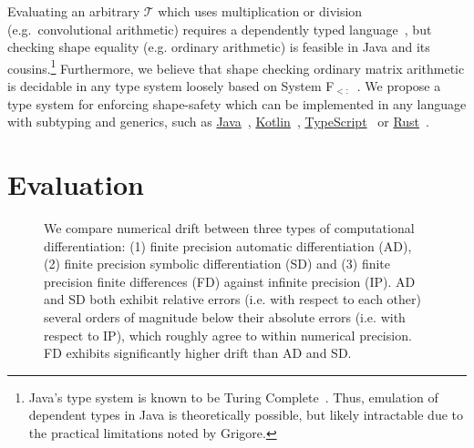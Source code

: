 \documentclass{article}
\begin{document}
Evaluating an arbitrary $\mathcal{T}$ which uses multiplication or division (e.g.\ convolutional arithmetic) requires a dependently typed language~\citep{xi1998eliminating, pineyro2019structure}, but checking shape equality (e.g. ordinary arithmetic) is feasible in Java and its cousins.\footnote{Java's type system is known to be Turing Complete~\citep{grigore2017java}. Thus, emulation of dependent types in Java is theoretically possible, but likely intractable due to the practical limitations noted by Grigore.} Furthermore, we believe that shape checking ordinary matrix arithmetic is decidable in any type system loosely based on System F${}_{<:}$~\citep{cardelli1991extension}. We propose a type system for enforcing shape-safety which can be implemented in any language with subtyping and generics, such as \href{https://docs.oracle.com/javase/tutorial/java/generics/index.html}{Java}~\citep{naftalin2007java}, \href{https://kotlinlang.org/docs/reference/generics.html}{Kotlin}~\citep{tate2013mixed}, \href{https://www.typescriptlang.org/docs/handbook/advanced-types.html}{TypeScript}~\citep{bierman2014understanding} or \href{https://doc.rust-lang.org/1.7.0/book/generics.html}{Rust}~\citep{crozet2019nalgebra}.

\section{Evaluation}
\begin{figure}
    \caption{We compare numerical drift between three types of computational differentiation: (1) finite precision automatic differentiation (AD), (2) finite precision symbolic differentiation (SD) and (3) finite precision finite differences (FD) against infinite precision (IP). AD and SD both exhibit relative errors (i.e. with respect to each other) several orders of magnitude below their absolute errors (i.e. with respect to IP), which roughly agree to within numerical precision. FD exhibits significantly higher drift than AD and SD.}
    \label{fig:pbt_comparison}
\end{figure}
\end{document}

